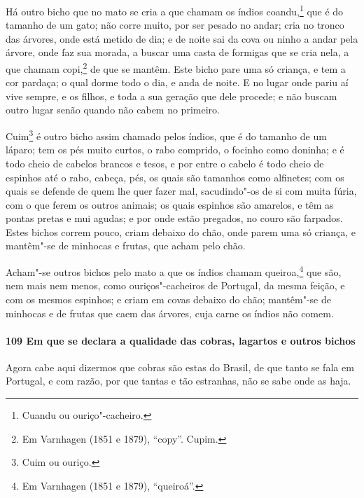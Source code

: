 Há outro bicho que no mato se cria a que chamam os índios coandu,\footnote{ Cuandu ou
ouriço"-cacheiro.} que é do tamanho de um gato; não corre muito, por ser pesado no andar;
cria no tronco das árvores, onde está metido de dia; e de noite sai da cova ou ninho a
andar pela árvore, onde faz sua morada, a buscar uma casta de formigas que se cria nela, a
que chamam copi,\footnote{ Em Varnhagen (1851 e 1879), ``copy''. Cupim.} de que se mantêm.
Este bicho pare uma só criança, e tem a cor pardaça; o qual dorme todo o dia, e anda de
noite. E no lugar onde pariu aí vive sempre, e os filhos, e toda a sua geração que dele
procede; e não buscam outro lugar senão quando não cabem no primeiro.

Cuim\footnote{ Cuim ou ouriço.} é outro bicho assim chamado pelos índios, que é do tamanho
de um láparo; tem os pés muito curtos, o rabo comprido, o focinho como doninha; e é todo
cheio de cabelos brancos e tesos, e por entre o cabelo é todo cheio de espinhos até o
rabo, cabeça, pés, os quais são tamanhos como alfinetes; com os quais se defende de quem
lhe quer fazer mal, sacudindo"-os de si com muita fúria, com o que ferem os outros animais;
os quais espinhos são amarelos, e têm as pontas pretas e mui agudas; e por onde estão
pregados, no couro são farpados. Estes bichos correm pouco, criam debaixo do chão, onde
parem uma só criança, e mantêm"-se de minhocas e frutas, que acham pelo chão.

Acham"-se outros bichos pelo mato a que os índios chamam queiroa,\footnote{ Em Varnhagen
(1851 e 1879), ``queiroá''.} que são, nem mais nem menos, como ouriços"-cacheiros de
Portugal, da mesma feição, e com os mesmos espinhos; e criam em covas debaixo do chão;
mantêm"-se de minhocas e de frutas que caem das árvores, cuja carne os índios não comem.

\paragraph{109 Em que se declara a qualidade das cobras, lagartos e outros bichos}

Agora cabe aqui dizermos que cobras são estas do Brasil, de que tanto se fala em Portugal,
e com razão, por que tantas e tão estranhas, não se sabe onde as haja.

